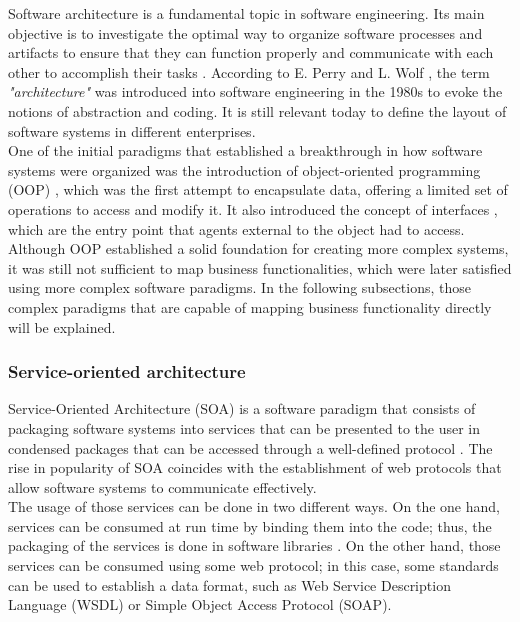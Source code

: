 \documentclass[english, 12pt, a4paper, sci, utf8, a-1b, online]{aaltothesis}
\begin{document}
Software architecture is a fundamental topic in software engineering. Its main objective is to investigate the optimal way to organize software processes and artifacts to ensure that they can function properly and communicate with each other to accomplish their tasks \cite{shadija2017towards}. According to E. Perry and L. Wolf \cite{perry1992foundations}, the term \textit{"architecture"} was introduced into software engineering in the 1980s to evoke the notions of abstraction and coding. It is still relevant today to define the layout of software systems in different enterprises.\\

One of the initial paradigms that established a breakthrough in how software systems were organized was the introduction of object-oriented programming (OOP) \cite{dahl1972chapter}, which was the first attempt to encapsulate data, offering a limited set of operations to access and modify it. It also introduced the concept of interfaces \cite{snyder1993essence}, which are the entry point that agents external to the object had to access. Although OOP established a solid foundation for creating more complex systems, it was still not sufficient to map business functionalities, which were later satisfied using more complex software paradigms. In the following subsections, those complex paradigms that are capable of mapping business functionality directly will be explained.

\subsubsection{Service-oriented architecture}

Service-Oriented Architecture (SOA) is a software paradigm that consists of packaging software systems into services that can be presented to the user in condensed packages that can be accessed through a well-defined protocol \cite{sprott2004understanding}. The rise in popularity of SOA coincides with the establishment of web protocols that allow software systems to communicate effectively.\\

The usage of those services can be done in two different ways. On the one hand, services can be consumed at run time by binding them into the code; thus, the packaging of the services is done in software libraries \cite{alahmari2010service}. On the other hand, those services can be consumed using some web protocol; in this case, some standards can be used to establish a data format, such as Web Service Description Language (WSDL) or Simple Object Access Protocol (SOAP).\\
\end{document}
